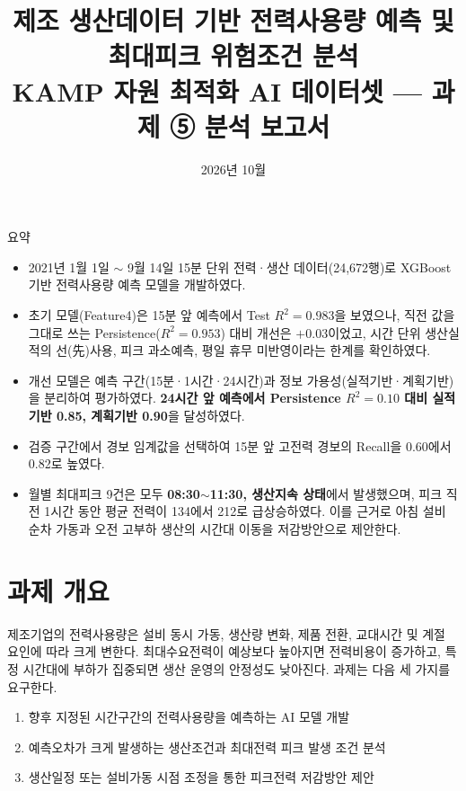 \documentclass[11pt,a4paper]{article}
\title{\textbf{제조 생산데이터 기반 전력사용량 예측 및\\최대피크 위험조건 분석}\\[4pt]
\large KAMP 자원 최적화 AI 데이터셋 --- 과제 ⑤ 분석 보고서}
\author{}
\date{2026년 10월}
\begin{document}
\maketitle
\thispagestyle{empty}

\begin{keybox}{요약}
\begin{itemize}[leftmargin=12pt]
  \item 2021년 1월 1일 $\sim$ 9월 14일 15분 단위 전력·생산 데이터(24,672행)로 XGBoost 기반 전력사용량 예측 모델을 개발하였다.
  \item 초기 모델(Feature4)은 15분 앞 예측에서 Test $R^2=0.983$을 보였으나, 직전 값을 그대로 쓰는 Persistence($R^2=0.953$) 대비 개선은 $+0.03$이었고, 시간 단위 생산실적의 선(先)사용, 피크 과소예측, 평일 휴무 미반영이라는 한계를 확인하였다.
  \item 개선 모델은 예측 구간(15분·1시간·24시간)과 정보 가용성(실적기반·계획기반)을 분리하여 평가하였다. \textbf{24시간 앞 예측에서 Persistence $R^2=0.10$ 대비 실적기반 0.85, 계획기반 0.90}을 달성하였다.
  \item 검증 구간에서 경보 임계값을 선택하여 15분 앞 고전력 경보의 Recall을 0.60에서 0.82로 높였다.
  \item 월별 최대피크 9건은 모두 \textbf{08:30$\sim$11:30, 생산지속 상태}에서 발생했으며, 피크 직전 1시간 동안 평균 전력이 134에서 212로 급상승하였다. 이를 근거로 아침 설비 순차 가동과 오전 고부하 생산의 시간대 이동을 저감방안으로 제안한다.
\end{itemize}
\end{keybox}

\tableofcontents
\newpage

\section{과제 개요}
제조기업의 전력사용량은 설비 동시 가동, 생산량 변화, 제품 전환, 교대시간 및 계절 요인에 따라 크게 변한다. 최대수요전력이 예상보다 높아지면 전력비용이 증가하고, 특정 시간대에 부하가 집중되면 생산 운영의 안정성도 낮아진다. 과제는 다음 세 가지를 요구한다.

\begin{enumerate}[label=\textbf{\arabic*)}]
  \item 향후 지정된 시간구간의 전력사용량을 예측하는 AI 모델 개발
  \item 예측오차가 크게 발생하는 생산조건과 최대전력 피크 발생 조건 분석
  \item 생산일정 또는 설비가동 시점 조정을 통한 피크전력 저감방안 제안
\end{enumerate}
\end{document}
